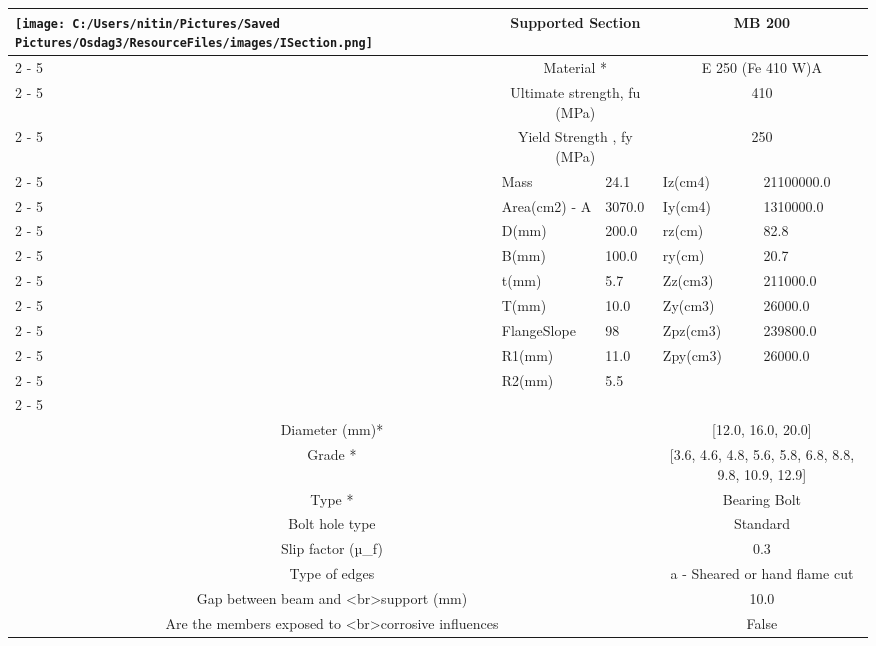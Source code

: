 \documentclass{article}%
\begin{document}
\begin{longtable}{|p{5cm}|p{2cm}|p{2cm}|p{2cm}|p{5cm}|}
\hline%
\hline%
\multirow{13}{*}{\texttt{[image: C:/Users/nitin/Pictures/Saved Pictures/Osdag3/ResourceFiles/images/ISection.png]}}&\multicolumn{2}{|c|}{Supported Section}&\multicolumn{2}{|c|}{MB 200}\\%
\cline{2%
-%
5}%
&\multicolumn{2}{|c|}{Material *}&\multicolumn{2}{|c|}{E 250 (Fe 410 W)A}\\%
\cline{2%
-%
5}%
&\multicolumn{2}{|c|}{Ultimate strength, fu (MPa)}&\multicolumn{2}{|c|}{410}\\%
\cline{2%
-%
5}%
&\multicolumn{2}{|c|}{Yield Strength , fy (MPa)}&\multicolumn{2}{|c|}{250}\\%
\cline{2%
-%
5}%
&Mass&24.1&Iz(cm4)&21100000.0\\%
\cline{2%
-%
5}%
&Area(cm2) {-} A&3070.0&Iy(cm4)&1310000.0\\%
\cline{2%
-%
5}%
&D(mm)&200.0&rz(cm)&82.8\\%
\cline{2%
-%
5}%
&B(mm)&100.0&ry(cm)&20.7\\%
\cline{2%
-%
5}%
&t(mm)&5.7&Zz(cm3)&211000.0\\%
\cline{2%
-%
5}%
&T(mm)&10.0&Zy(cm3)&26000.0\\%
\cline{2%
-%
5}%
&FlangeSlope&98&Zpz(cm3)&239800.0\\%
\cline{2%
-%
5}%
&R1(mm)&11.0&Zpy(cm3)&26000.0\\%
\cline{2%
-%
5}%
&R2(mm)&5.5&&\\%
\cline{2%
-%
5}%
\hline%
\multicolumn{5}{|c|}{\textbf{Bolt Details}}\\%
\hline%
\hline%
\multicolumn{3}{|c|}{Diameter (mm)*}&\multicolumn{2}{|c|}{{[}12.0, 16.0, 20.0{]}}\\%
\hline%
\hline%
\multicolumn{3}{|c|}{Grade *}&\multicolumn{2}{|c|}{{[}3.6, 4.6, 4.8, 5.6, 5.8, 6.8, 8.8, 9.8, 10.9, 12.9{]}}\\%
\hline%
\hline%
\multicolumn{3}{|c|}{Type *}&\multicolumn{2}{|c|}{Bearing Bolt}\\%
\hline%
\hline%
\multicolumn{3}{|c|}{Bolt hole type}&\multicolumn{2}{|c|}{Standard}\\%
\hline%
\hline%
\multicolumn{3}{|c|}{Slip factor (µ\_f)}&\multicolumn{2}{|c|}{0.3}\\%
\hline%
\hline%
\multicolumn{3}{|c|}{Type of edges}&\multicolumn{2}{|c|}{a {-} Sheared or hand flame cut}\\%
\hline%
\hline%
\multicolumn{3}{|c|}{Gap between beam and <br>support (mm)}&\multicolumn{2}{|c|}{10.0}\\%
\hline%
\hline%
\multicolumn{3}{|c|}{Are the members exposed to <br>corrosive influences}&\multicolumn{2}{|c|}{False}\\%

\end{longtable}
\end{document}
